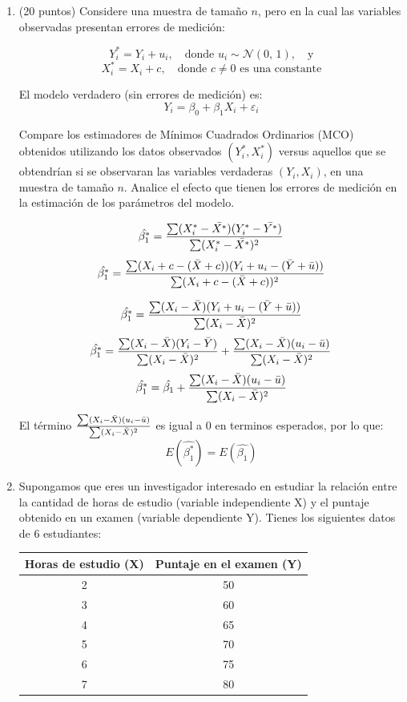\documentclass[10pt,a4paper]{article}
\begin{document}
\begin{enumerate}
{\begin{enumerate}
\end{enumerate}
}




\item (20 puntos) Considere una muestra de tamaño \( n \), pero en la cual las variables observadas presentan errores de medición:

\[
Y_i^* = Y_i + u_i, \quad \text{donde } u_i \sim \mathcal{N}(0,\,1), \quad \text{y}
\]
\[
X_i^* = X_i + c, \quad \text{donde } c \neq 0 \text{ es una constante}
\]

El modelo verdadero (sin errores de medición) es:
\[
Y_i = \beta_0 + \beta_1 X_i + \varepsilon_i
\]

Compare los estimadores de Mínimos Cuadrados Ordinarios (MCO) obtenidos utilizando los datos observados \((Y_i^*, X_i^*)\) versus aquellos que se obtendrían si se observaran las variables verdaderas \((Y_i, X_i)\), en una muestra de tamaño \( n \). Analice el efecto que tienen los errores de medición en la estimación de los parámetros del modelo.

{\color{blue}
$$\hat{\beta_1^*} = \frac{\sum (X_i^*-\Bar{X^*})(Y_i^*-\Bar{Y^*})}{\sum (X_i^*-\Bar{X^*})^2}$$
$$\hat{\beta_1^*} = \frac{\sum (X_i+c-(\Bar{X}+c))(Y_i+u_i-(\Bar{Y}+\Bar{u}))}{\sum (X_i+c-(\Bar{X}+c))^2}$$


$$\hat{\beta_1^*} = \frac{\sum (X_i-\Bar{X})(Y_i+u_i-(\Bar{Y}+\Bar{u}))}{\sum (X_i-\Bar{X})^2}$$
$$\hat{\beta_1^*} = \frac{\sum (X_i-\Bar{X})(Y_i-\Bar{Y})}{\sum (X_i-\Bar{X})^2} + \frac{\sum (X_i-\Bar{X})(u_i-\Bar{u})}{\sum (X_i-\Bar{X})^2}$$
$$\hat{\beta_1^*} = \hat{\beta_1} + \frac{\sum (X_i-\Bar{X})(u_i-\Bar{u})}{\sum (X_i-\Bar{X})^2}$$



El t\'ermino $\frac{\sum (X_i-\Bar{X})(u_i-\Bar{u})}{\sum (X_i-\Bar{X})^2}$ es igual a 0 en terminos esperados, por lo que:
 $$E(\hat{\beta_1^*}) = E(\hat{\beta_1})$$

}

\item  Supongamos que eres un investigador interesado en estudiar la relación entre la cantidad de horas de estudio (variable independiente X) y el puntaje obtenido en un examen (variable dependiente Y).
Tienes los siguientes datos de 6 estudiantes:

\begin{table}[h!]
\centering
\begin{tabular}{|c|c|}
\hline
\textbf{Horas de estudio (X)} & \textbf{Puntaje en el examen (Y)} \\
\hline
2 & 50 \\
3 & 60 \\
4 & 65 \\
5 & 70 \\
6 & 75 \\
7 & 80 \\
\hline
\end{tabular}
\label{tabla:estudio_puntaje}
\end{table}


\end{enumerate}
\end{document}
